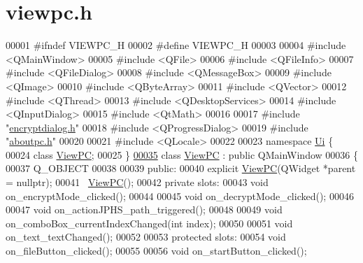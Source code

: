 \hypertarget{viewpc_8h_source}{}\section{viewpc.\+h}
\label{viewpc_8h_source}

\begin{DoxyCode}
00001 \textcolor{preprocessor}{#ifndef VIEWPC\_H}
00002 \textcolor{preprocessor}{#define VIEWPC\_H}
00003 
00004 \textcolor{preprocessor}{#include <QMainWindow>}
00005 \textcolor{preprocessor}{#include <QFile>}
00006 \textcolor{preprocessor}{#include <QFileInfo>}
00007 \textcolor{preprocessor}{#include <QFileDialog>}
00008 \textcolor{preprocessor}{#include <QMessageBox>}
00009 \textcolor{preprocessor}{#include <QImage>}
00010 \textcolor{preprocessor}{#include <QByteArray>}
00011 \textcolor{preprocessor}{#include <QVector>}
00012 \textcolor{preprocessor}{#include <QThread>}
00013 \textcolor{preprocessor}{#include <QDesktopServices>}
00014 \textcolor{preprocessor}{#include <QInputDialog>}
00015 \textcolor{preprocessor}{#include <QtMath>}
00016 
00017 \textcolor{preprocessor}{#include "\hyperlink{encryptdialog_8h}{encryptdialog.h}"}
00018 \textcolor{preprocessor}{#include <QProgressDialog>}
00019 \textcolor{preprocessor}{#include "\hyperlink{aboutpc_8h}{aboutpc.h}"}
00020 
00021 \textcolor{preprocessor}{#include <QLocale>}
00022 
00023 \textcolor{keyword}{namespace }\hyperlink{namespace_ui}{Ui} \{
00024 \textcolor{keyword}{class }\hyperlink{class_view_p_c}{ViewPC};
00025 \}
\hypertarget{viewpc_8h_source.tex_l00035}{}\hyperlink{class_view_p_c}{00035} \textcolor{keyword}{class }\hyperlink{class_view_p_c}{ViewPC} : \textcolor{keyword}{public} QMainWindow
00036 \{
00037     Q\_OBJECT
00038 
00039 \textcolor{keyword}{public}:
00040     \textcolor{keyword}{explicit} \hyperlink{class_view_p_c}{ViewPC}(QWidget *parent = \textcolor{keyword}{nullptr});
00041     ~\hyperlink{class_view_p_c}{ViewPC}();
00042 \textcolor{keyword}{private} slots:
00043     \textcolor{keywordtype}{void} on\_encryptMode\_clicked();
00044 
00045     \textcolor{keywordtype}{void} on\_decryptMode\_clicked();
00046 
00047     \textcolor{keywordtype}{void} on\_actionJPHS\_path\_triggered();
00048 
00049     \textcolor{keywordtype}{void} on\_comboBox\_currentIndexChanged(\textcolor{keywordtype}{int} index);
00050 
00051     \textcolor{keywordtype}{void} on\_text\_textChanged();
00052 
00053 \textcolor{keyword}{protected} slots:
00054     \textcolor{keywordtype}{void} on\_fileButton\_clicked();
00055 
00056     \textcolor{keywordtype}{void} on\_startButton\_clicked();

\end{DoxyCode}
